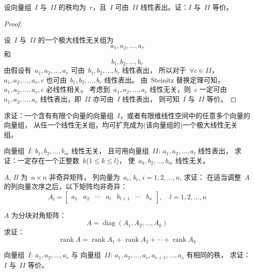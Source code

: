 \documentclass[twoside,openright]{book}
\begin{document}
\begin{CJK*}{UTF8}{}
\begin{quest}
\label{quest:126}
设向量组\ $I$ 与\ $II$ 的秩均为\ $r$，且\ $I$ 可由\ $II$ 线性表出。证：$I$ 与\ $II$ 等价。
\end{quest}
\begin{proof}
$ $

设\ $I$ 与\ $II$ 的一个极大线性无关组为
\[
a_1, a_2,\dots,a_r
\]
和
\[
b_1, b_2,\dots,b_r
\]
由假设有\ $a_1, a_2,\dots,a_r$ 可由\ $b_1, b_2,\dots,b_r$ 线性表出，
所以对于\ $\forall c \in II$，$a_1, a_2,\dots,a_r,c$ 也可由\ $b_1, b_2,\dots,b_r$ 线性表出。
由\ Steinitz 替换定理可知，$a_1, a_2,\dots,a_r,c$ 必线性相关。
考虑到\ $a_1, a_2,\dots,a_r$ 线性无关，则\ $c$ 一定可由\ $a_1, a_2,\dots,a_r$ 线性表出，即\ $II$ 亦可由\ $I$ 线性表出，
则可知\ $I$ 与\ $II$ 等价。
\end{proof}

\begin{quest}
\label{quest:127}
求证：一个含有有限个向量的向量组\ $I$，或者有限维线性空间中的任意多个向量的向量组，
从任一个线性无关组，均可扩充成为(该向量组的)一个极大线性无关组。
\end{quest}

\begin{quest}
\label{quest:128}
向量组\ $I$: $b_1,b_2,\dots,b_m$ 线性无关，
且可用向量组\ $II$: $a_1,a_2,\dots,a_l$ 线性表出，
求证：一定存在一个正整数\ $k$($1\leq k\leq l$)，
使\ $a_k,b_2,\dots,b_m$ 线性无关。
\end{quest}

\begin{quest}
\label{quest:129}
$A$, $B$ 为\ $n \times n$ 非奇异矩阵，
列向量为\ $a_i$, $b_i$, $i=1,2,\dotsc,n$, 求证：
在适当调整\ $A$ 的列向量次序之后，以下矩阵均非奇异：
\[
A_l =
\begin{bmatrix}
a_1 & a_2 & \cdots & a_l & b_{l+1} & \cdots & b_n
\end{bmatrix},\quad l=1,2,\dotsc,n
\]
\end{quest}

\begin{quest}
\label{quest:130}
$A$ 为分块对角矩阵：
\[
A = \operatorname{diag} (A_1,A_2,\dotsc,A_k)
\]
求证：
\[
\operatorname{rank} A =
\operatorname{rank} A_1 +
\operatorname{rank} A_2 + \dotsb +
\operatorname{rank} A_k
\]
\end{quest}

\begin{quest}
\label{quest:131}
向量组\ $I$: $a_1,a_2,\dots,a_r$ 与
向量组\ $II$: $a_1,a_2,\dots,a_r,a_{r+1},\dots,a_s$ 有相同的秩，
求证：$I$ 与\ $II$ 等价。
\end{quest}


\end{CJK*}
\end{document}
